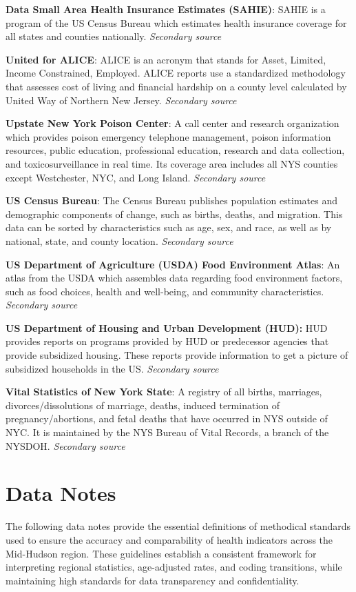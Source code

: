 \documentclass[
  english,
  letterpaper,
]{report}
\begin{document}
\textbf{Data Small Area Health Insurance Estimates (SAHIE)}: SAHIE is a
program of the US Census Bureau which estimates health insurance
coverage for all states and counties nationally. \emph{Secondary source}

\textbf{United for ALICE}: ALICE is an acronym that stands for Asset,
Limited, Income Constrained, Employed. ALICE reports use a standardized
methodology that assesses cost of living and financial hardship on a
county level calculated by United Way of Northern New Jersey.
\emph{Secondary source}

\textbf{Upstate New York Poison Center}: A call center and research
organization which provides poison emergency telephone management,
poison information resources, public education, professional education,
research and data collection, and toxicosurveillance in real time. Its
coverage area includes all NYS counties except Westchester, NYC, and
Long Island. \emph{Secondary source}

\textbf{US Census Bureau}: The Census Bureau publishes population
estimates and demographic components of change, such as births, deaths,
and migration. This data can be sorted by characteristics such as age,
sex, and race, as well as by national, state, and county location.
\emph{Secondary source}

\textbf{US Department of Agriculture (USDA) Food Environment Atlas}: An
atlas from the USDA which assembles data regarding food environment
factors, such as food choices, health and well-being, and community
characteristics. \emph{Secondary source}

\textbf{US Department of Housing and Urban Development (HUD):} HUD
provides reports on programs provided by HUD or predecessor agencies
that provide subsidized housing. These reports provide information to
get a picture of subsidized households in the US. \emph{Secondary
source}

\textbf{Vital Statistics of New York State}: A registry of all births,
marriages, divorces/dissolutions of marriage, deaths, induced
termination of pregnancy/abortions, and fetal deaths that have occurred
in NYS outside of NYC. It is maintained by the NYS Bureau of Vital
Records, a branch of the NYSDOH. \emph{Secondary source}

\section{Data Notes}\label{data-notes}

The following data notes provide the essential definitions of methodical
standards used to ensure the accuracy and comparability of health
indicators across the Mid-Hudson region. These guidelines establish a
consistent framework for interpreting regional statistics, age-adjusted
rates, and coding transitions, while maintaining high standards for data
transparency and confidentiality.
\end{document}
